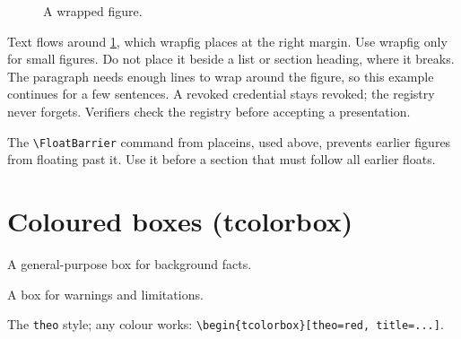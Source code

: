 \begin{figure}
  \centering
  \captionsetup{format=plain, justification=centering}
  \caption{A wrapped figure.}\label{guide:fig:latex:wrap}
\end{figure}
Text flows around \cref{guide:fig:latex:wrap}, which wrapfig places at the right margin.
Use wrapfig only for small figures. Do not place it beside a list or section heading, where it breaks.
The paragraph needs enough lines to wrap around the figure, so this example continues for a few sentences.
A revoked credential stays revoked; the registry never forgets.
Verifiers check the registry before accepting a presentation.

\FloatBarrier
The \texttt{\textbackslash FloatBarrier} command from placeins, used above, prevents earlier figures from floating past it.
Use it before a section that must follow all earlier floats.

\section{Coloured boxes (tcolorbox)}\label{guide:latex:boxes}
\begin{infobox}[Information]
  A general-purpose box for background facts.
\end{infobox}
\begin{warnbox}
  A box for warnings and limitations.
\end{warnbox}
\begin{keybox}
  The \texttt{theo} style; any colour works: \texttt{\textbackslash begin\{tcolorbox\}[theo=red, title=...]}.
\end{keybox}

